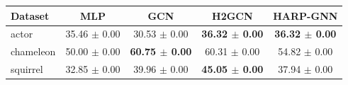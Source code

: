 \begin{tabular}{lcccc}
\toprule
Dataset & MLP & GCN & H2GCN & HARP-GNN \\
\midrule
actor & 35.46 $\pm$ 0.00 & 30.53 $\pm$ 0.00 & \textbf{36.32 $\pm$ 0.00} & \textbf{36.32 $\pm$ 0.00} \\
chameleon & 50.00 $\pm$ 0.00 & \textbf{60.75 $\pm$ 0.00} & 60.31 $\pm$ 0.00 & 54.82 $\pm$ 0.00 \\
squirrel & 32.85 $\pm$ 0.00 & 39.96 $\pm$ 0.00 & \textbf{45.05 $\pm$ 0.00} & 37.94 $\pm$ 0.00 \\
\bottomrule
\end{tabular}
